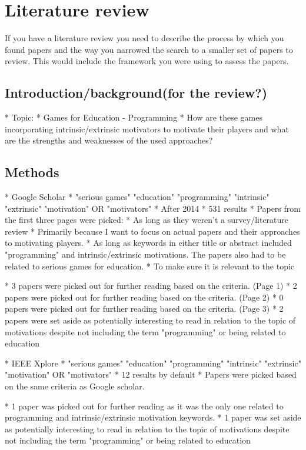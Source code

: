\section{Literature review}
If you have a literature review you need to describe the process by which you found papers and the way you narrowed the search to a smaller set of papers to review.  This would include the framework you were using to assess the papers.

\subsection{Introduction/background(for the review?)}
    * Topic: 
    * Games for Education - Programming
        * How are these games incorporating intrinsic/extrinsic motivators to motivate their players and what are the strengths and weaknesses of the used approaches?

\subsection{Methods}
    * Google Scholar
        * "serious games" "education" "programming" "intrinsic" "extrinsic" "motivation" OR "motivators"
        * After 2014
        * 531 results
        * Papers from the first three pages were picked:
            * As long as they weren't a survey/literature review
                * Primarily because I want to focus on actual papers and their approaches to motivating players. 
            * As long as keywords in either title or abstract included "programming" and intrinsic/extrinsic motivations. The papers also had to be related to serious games for education. 
                * To make sure it is relevant to the topic
        
        * 3 papers were picked out for further reading based on the criteria. (Page 1)
        * 2 papers were picked out for further reading based on the criteria. (Page 2)
        * 0 papers were picked out for further reading based on the criteria. (Page 3)
        * 2 papers were set aside as potentially interesting to read in relation to the topic of motivations despite not including the term "programming" or being related to education 

    * IEEE Xplore
        * "serious games" "education" "programming" "intrinsic" "extrinsic" "motivation" OR "motivators"
        * 12 results by default
        * Papers were picked based on the same criteria as Google scholar.
        
        * 1 paper was picked out for further reading as it was the only one related to programming and intrinsic/extrinsic motivation keywords. 
        * 1 paper was set aside as potentially interesting to read in relation to the topic of motivations despite not including the term "programming" or being related to education 
        
